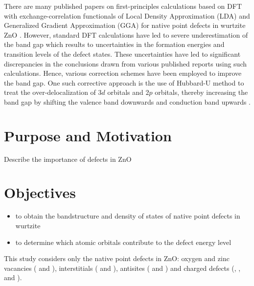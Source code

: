 There are many published papers on first-principles  calculations based on DFT with exchange-correlation functionals of Local Density Approximation (LDA) and Generalized Gradient Approximation (GGA) for native point defects in wurtzite ZnO \citep{Kohan2000,Walle2001,Zhang2001,Oba2001,Lee2001,Erhart2005,Erhart2006,Lany2007}. However, standard DFT calculations have led to severe underestimation of the  band gap which results to uncertainties in the formation energies and transition levels of the defect states.  These uncertainties have led to significant discrepancies in the conclusions drawn from various published reports using such calculations. Hence, various correction schemes have been employed to improve the band gap. One such corrective approach is the use of Hubbard-U method  to treat the over-delocalization of $3d$  orbitals and $2p$  orbitals,  thereby increasing the band gap by shifting the valence band downwards and conduction band upwards \citep{Qiao2014,Yaakob2014,Parhizgar2018,Harun2020}. 

\section{Purpose and Motivation}
Describe the importance of defects in ZnO
\section{Objectives}
\begin{itemize}
    \item to obtain the bandstructure and density of states of native point defects in wurtzite 
    \item to determine which atomic orbitals  contribute to the defect energy level
\end{itemize}

This study considers only the native point defects in ZnO: oxygen and zinc vacancies ( and ), interstitials ( and ), antisites ( and ) and charged defects (, ,  and ). 
